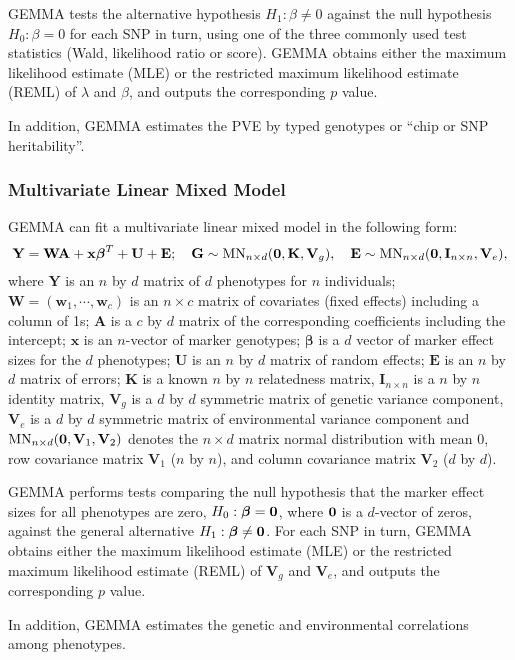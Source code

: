 \documentclass[11pt]{article}
\newcommand{\bx}{\mathbf{x}}
\newcommand{\bw}{\mathbf{w}}
\newcommand{\bK}{\mathbf{K}}
\newcommand{\bV}{\mathbf{V}}
\newcommand{\bA}{\mathbf{A}}
\newcommand{\bY}{\mathbf{Y}}
\newcommand{\bE}{\mathbf{E}}
\newcommand{\bG}{\mathbf{G}}
\newcommand{\bW}{\mathbf{W}}
\newcommand{\bU}{\mathbf{U}}
\newcommand{\bI}{\mathbf{I}}
\newcommand{\bbeta}{\boldsymbol\beta}
\begin{document}
GEMMA tests the alternative hypothesis $H_1: \beta\neq 0$ against the
null hypothesis $H_0: \beta=0$ for each SNP in turn, using one of the
three commonly used test statistics (Wald, likelihood ratio or
score). GEMMA obtains either the maximum likelihood estimate (MLE) or
the restricted maximum likelihood estimate (REML) of $\lambda$ and
$\beta$, and outputs the corresponding $p$ value.

In addition, GEMMA estimates the PVE by typed genotypes or ``chip or
SNP heritability''.

\subsubsection{Multivariate Linear Mixed Model}
GEMMA can fit a multivariate linear mixed model in the following form:
%
\begin{equation*}
\bY = \bW \bA+\bx\bbeta^T+\bU+\bE;  \quad
\bG \sim \mbox{MN}_{n \times d}({\bf 0}, \bK, \bV_g),
\quad \bE \sim \mbox{MN}_{n \times d}({\bf 0}, \bI_{n\times n}, \bV_e),
\end{equation*}
%
where $\bY$ is an $n$ by $d$ matrix of $d$ phenotypes for $n$
individuals; $\bW=(\bw_1, \cdots, \bw_c)$ is an $n\times c$ matrix of
covariates (fixed effects) including a column of 1s; $\bA$ is a $c$ by
$d$ matrix of the corresponding coefficients including the intercept;
$\bx$ is an $n$-vector of marker genotypes; $\bbeta$ is a $d$ vector
of marker effect sizes for the $d$ phenotypes; $\bU$ is an $n$ by $d$
matrix of random effects; $\bE$ is an $n$ by $d$ matrix of errors;
$\bK$ is a known $n$ by $n$ relatedness matrix, $\bI_{n\times n}$ is a
$n$ by $n$ identity matrix, $\bV_g$ is a $d$ by $d$ symmetric matrix
of genetic variance component, $\bV_e$ is a $d$ by $d$ symmetric
matrix of environmental variance component and $\mbox{MN}_{n \times
  d}({\bf 0}, \bV_1, \bV_2)$ denotes the $n \times d$ matrix normal
distribution with mean 0, row covariance matrix $\bV_1$ ($n$ by $n$),
and column covariance matrix $\bV_2$ ($d$ by $d$).

GEMMA performs tests comparing the null hypothesis that the marker
effect sizes for all phenotypes are zero, $H_0: \bbeta= {\bf 0}$,
where ${\bf 0}$ is a $d$-vector of zeros, against the general
alternative $H_1: \bbeta\neq {\bf 0}$. For each SNP in turn, GEMMA
obtains either the maximum likelihood estimate (MLE) or the restricted
maximum likelihood estimate (REML) of $\bV_g$ and $\bV_e$, and outputs
the corresponding $p$ value.

In addition, GEMMA estimates the genetic and environmental
correlations among phenotypes.
\end{document}
